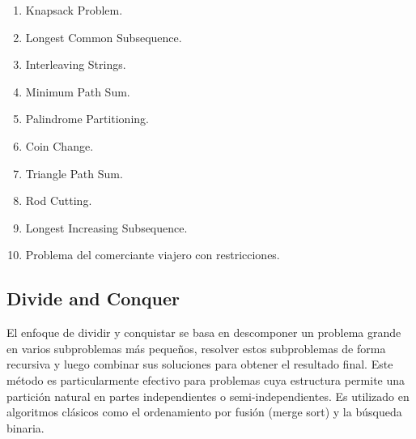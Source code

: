 \begin{enumerate} 
  \item Knapsack Problem.

  \item Longest Common Subsequence.

  \item Interleaving Strings.

  \item Minimum Path Sum.

  \item Palindrome Partitioning.

  \item Coin Change.

  \item Triangle Path Sum.

  \item Rod Cutting.

  \item Longest Increasing Subsequence.

  \item Problema del comerciante viajero con restricciones. 
\end{enumerate}

\subsection{Divide and Conquer}  
El enfoque de dividir y conquistar se basa en descomponer un problema grande en varios subproblemas más pequeños, resolver estos subproblemas de forma recursiva y luego combinar sus soluciones para obtener el resultado final. Este método es particularmente efectivo para problemas cuya estructura permite una partición natural en partes independientes o semi-independientes. Es utilizado en algoritmos clásicos como el ordenamiento por fusión (merge sort) y la búsqueda binaria.  

